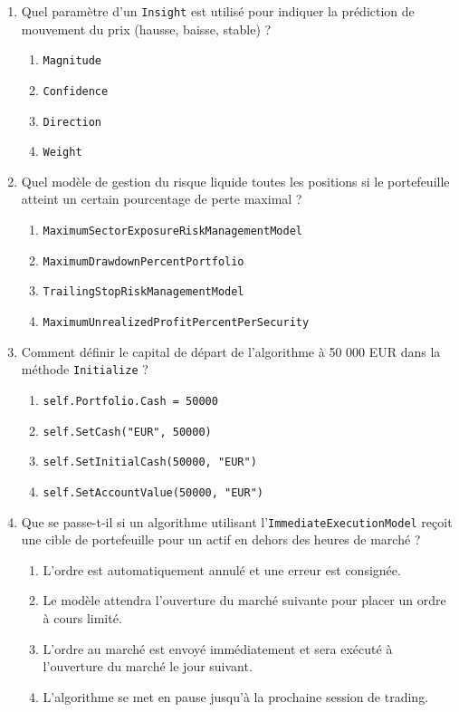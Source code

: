 \documentclass[a4paper,12pt]{article}
\begin{document}
\begin{enumerate}
    \item Quel paramètre d'un \texttt{Insight} est utilisé pour indiquer la prédiction de mouvement du prix (hausse, baisse, stable) ?
    \begin{enumerate}[label=(\Alph*)]
        \item \texttt{Magnitude}
        \item \texttt{Confidence}
        \item \texttt{Direction}
        \item \texttt{Weight}
    \end{enumerate}

    \item Quel modèle de gestion du risque liquide toutes les positions si le portefeuille atteint un certain pourcentage de perte maximal ?
    \begin{enumerate}[label=(\Alph*)]
        \item \texttt{MaximumSectorExposureRiskManagementModel}
        \item \texttt{MaximumDrawdownPercentPortfolio}
        \item \texttt{TrailingStopRiskManagementModel}
        \item \texttt{MaximumUnrealizedProfitPercentPerSecurity}
    \end{enumerate}

    \item Comment définir le capital de départ de l'algorithme à 50 000 EUR dans la méthode \texttt{Initialize} ?
    \begin{enumerate}[label=(\Alph*)]
        \item \texttt{self.Portfolio.Cash = 50000}
        \item \texttt{self.SetCash("EUR", 50000)}
        \item \texttt{self.SetInitialCash(50000, "EUR")}
        \item \texttt{self.SetAccountValue(50000, "EUR")}
    \end{enumerate}

    \item Que se passe-t-il si un algorithme utilisant l'\texttt{ImmediateExecutionModel} reçoit une cible de portefeuille pour un actif en dehors des heures de marché ?
    \begin{enumerate}[label=(\Alph*)]
        \item L'ordre est automatiquement annulé et une erreur est consignée.
        \item Le modèle attendra l'ouverture du marché suivante pour placer un ordre à cours limité.
        \item L'ordre au marché est envoyé immédiatement et sera exécuté à l'ouverture du marché le jour suivant.
        \item L'algorithme se met en pause jusqu'à la prochaine session de trading.
    \end{enumerate}
\end{enumerate}
\end{document}
